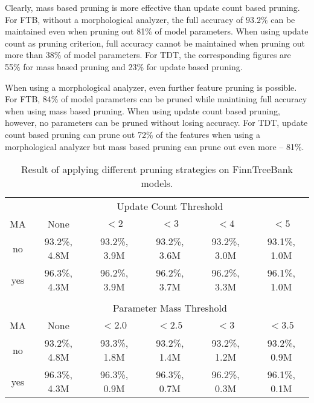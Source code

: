 Clearly, mass based pruning is more effective than update count based
pruning. For FTB, without a morphological analyzer, the full accuracy
of $93.2\%$ can be maintained even when pruning out 81\% of model
parameters. When using update count as pruning criterion, full
accuracy cannot be maintained when pruning out more than 38\% of model
parameters. For TDT, the corresponding figures are 55\% for mass based
pruning and 23\% for update based pruning.

When using a morphological analyzer, even further feature pruning is
possible. For FTB, 84\% of model parameters can be pruned while
maintining full accuracy when using mass based pruning. When using
update count based pruning, however, no parameters can be pruned
without losing accuracy. For TDT, update count based pruning can prune
out 72\% of the features when using a morphological analyzer but mass
based pruning can prune out even more -- 81\%.

\begin{table}[htb!]
\begin{center}
\begin{tabular}{c|ccccc}
\multicolumn{1}{c}{}        & \multicolumn{5}{c}{Update Count Threshold}\\
MA                     & None           & $< 2$        & $< 3$        & $< 4$        & $< 5$       \\
\hline
no                     & 93.2\%, 4.8M   & 93.2\%, 3.9M & 93.2\%, 3.6M & 93.2\%, 3.0M & 93.1\%, 1.0M \\
yes                    & 96.3\%, 4.3M   & 96.2\%, 3.9M & 96.2\%, 3.7M & 96.2\%, 3.3M & 96.1\%, 1.0M \\
                       &                &              &              &              &              \\
\multicolumn{1}{c}{}                        & \multicolumn{5}{c}{Parameter Mass Threshold}\\
MA                     & None         & $< 2.0$      & $< 2.5$      & $< 3$      & $< 3.5$        \\
\hline
no                     & 93.2\%, 4.8M & 93.3\%, 1.8M & 93.2\%, 1.4M & 93.2\%, 1.2M & 93.2\%, 0.9M \\
yes                    & 96.3\%, 4.3M & 96.3\%, 0.9M & 96.3\%, 0.7M & 96.2\%, 0.3M & 96.1\%, 0.1M \\
\end{tabular}
\caption{Result of applying different pruning strategies on FinnTreeBank models.}
\end{center}
\end{table}

